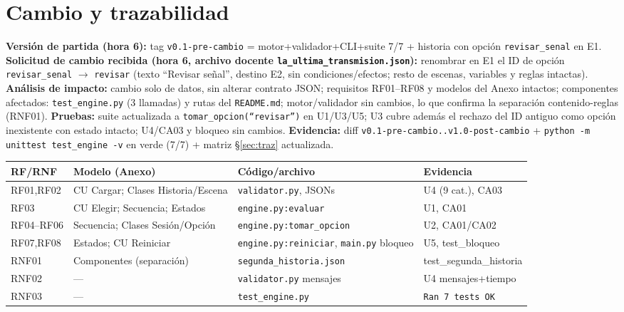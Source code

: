 \documentclass[11pt,a4paper]{article}
\begin{document}
\section{Cambio y trazabilidad}
\textbf{Versi\'on de partida (hora 6):} tag \texttt{v0.1-pre-cambio} = motor+validador+CLI+suite 7/7 + historia con opci\'on \texttt{revisar\_senal} en E1. \textbf{Solicitud de cambio recibida (hora 6, archivo docente \texttt{la\_ultima\_transmision.json}):} renombrar en E1 el ID de opci\'on \texttt{revisar\_senal} $\to$ \texttt{revisar} (texto ``Revisar se\~nal'', destino E2, sin condiciones/efectos; resto de escenas, variables y reglas intactas). \textbf{An\'alisis de impacto:} cambio solo de datos, sin alterar contrato JSON; requisitos RF01--RF08 y modelos del Anexo intactos; componentes afectados: \texttt{test\_engine.py} (3 llamadas) y rutas del \texttt{README.md}; motor/validador sin cambios, lo que confirma la separaci\'on contenido-reglas (RNF01). \textbf{Pruebas:} suite actualizada a \texttt{tomar\_opcion(``revisar'')} en U1/U3/U5; U3 cubre adem\'as el rechazo del ID antiguo como opci\'on inexistente con estado intacto; U4/CA03 y bloqueo sin cambios. \textbf{Evidencia:} diff \texttt{v0.1-pre-cambio..v1.0-post-cambio} + \texttt{python -m unittest test\_engine -v} en verde (7/7) + matriz \S\ref{sec:traz} actualizada.

\label{sec:traz}
\begin{center}
\small\begin{tabular}{p{1.6cm}p{3.2cm}p{3.5cm}p{4.2cm}}
\toprule RF/RNF & Modelo (Anexo) & C\'odigo/archivo & Evidencia \\
\midrule RF01,RF02 & CU Cargar; Clases Historia/Escena & \texttt{validator.py}, JSONs & U4 (9 cat.), CA03 \\
RF03 & CU Elegir; Secuencia; Estados & \texttt{engine.py:evaluar} & U1, CA01 \\
RF04--RF06 & Secuencia; Clases Sesi\'on/Opci\'on & \texttt{engine.py:tomar\_opcion} & U2, CA01/CA02 \\
RF07,RF08 & Estados; CU Reiniciar & \texttt{engine.py:reiniciar}, \texttt{main.py} bloqueo & U5, test\_bloqueo \\
RNF01 & Componentes (separaci\'on) & \texttt{segunda\_historia.json} & test\_segunda\_historia \\
RNF02 & --- & \texttt{validator.py} mensajes & U4 mensajes+tiempo \\
RNF03 & --- & \texttt{test\_engine.py} & \texttt{Ran 7 tests OK} \\
\bottomrule
\end{tabular}
\end{center}
\end{document}
